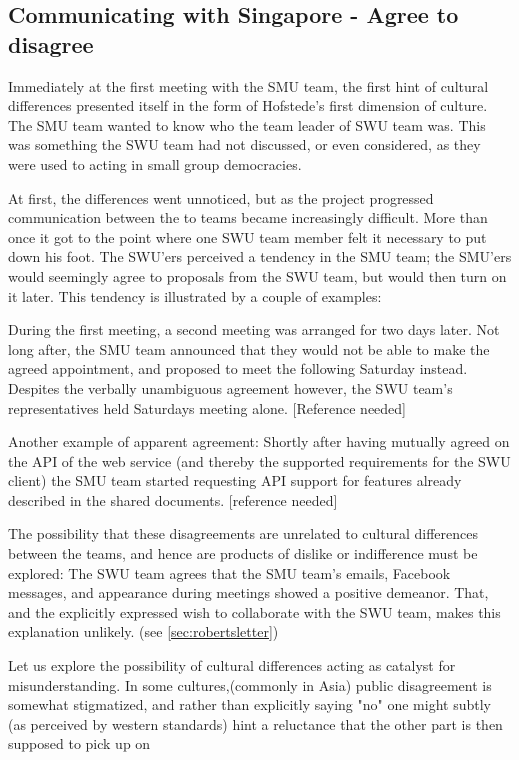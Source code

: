 \subsection{Communicating with Singapore - Agree to disagree}
\label{sec:communicating}

Immediately at the first meeting with the SMU team, the  first hint of cultural 
differences presented itself in the form of Hofstede's first 
dimension of culture\cite{surprises}. The SMU team wanted to know who the team leader of SWU team was. 
This was something the SWU team had not discussed, or even considered, as they 
were used to acting in small group democracies.

At first, the differences went unnoticed, but as the project progressed 
communication between the to teams became increasingly difficult. More than 
once it got to the point where one SWU team member felt it necessary to put 
down his foot.\cite{enough} 
The SWU'ers perceived a tendency in the SMU team; the SMU'ers would seemingly 
agree to proposals from the SWU team, but would then turn on it later. 
This tendency is illustrated by a couple of examples: 

During the first meeting, a second meeting was arranged for two 
days later. Not long after, the SMU team announced that they would 
not be able to make the agreed appointment, and proposed to meet the following 
Saturday instead. Despites the verbally unambiguous agreement however, 
the SWU team's representatives held Saturdays meeting alone. [Reference needed] 

Another example of apparent agreement: 
Shortly after having mutually agreed on the API of the web 
service (and thereby the supported requirements for the SWU client) 
the SMU team started requesting API support for features already 
described in the shared documents. [reference needed]

The possibility that these disagreements are unrelated to cultural 
differences between the teams, and hence are products of dislike or 
indifference must be explored: The SWU team agrees that the SMU team's emails, Facebook 
messages, and appearance during meetings showed a positive demeanor. That, and 
the explicitly expressed wish to collaborate with the SWU team, makes this 
explanation unlikely. (see \ref{sec:robertsletter})

Let us explore the possibility of cultural differences acting as catalyst for 
misunderstanding.
In some cultures,(commonly in Asia)\cite{surprises, herbsiemens} public 
disagreement is somewhat stigmatized, and rather than explicitly saying "no" 
one might subtly (as perceived by western standards) hint a reluctance
that the other part is then supposed to pick up on

